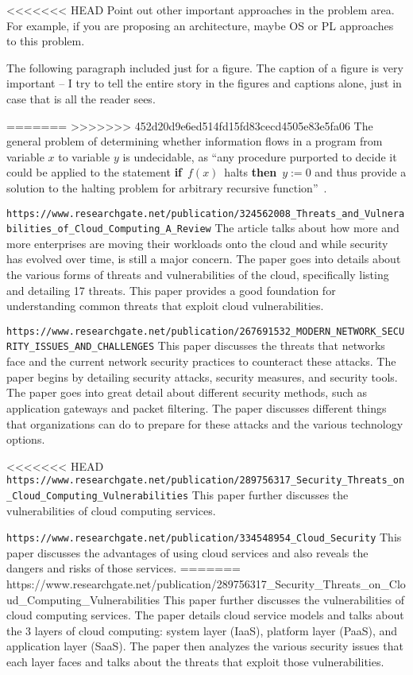 <<<<<<< HEAD
Point out other important approaches in the problem area. For example, if you 
are proposing an architecture, maybe OS or PL approaches to this problem. 

The following paragraph included just for a figure. The caption of a figure is very
important -- I try to tell the entire story in the figures and captions alone, 
just in case that is all the reader sees.

=======
>>>>>>> 452d20d9e6ed514fd15fd83cecd4505e83e5fa06
The general problem of determining whether information flows in a program from
variable $x$ to variable $y$ is undecidable, as ``any procedure purported to
decide it could be applied to the statement {\bf if}~$f(x)$~halts {\bf then}~$y
:= 0$ and thus provide a solution to the halting problem for arbitrary
recursive function''~\cite{denning-impossible}.  

\verb|https://www.researchgate.net/publication/324562008_Threats_and_Vulnerabilities_of_Cloud_Computing_A_Review|
The article talks about how more and more enterprises are moving their workloads onto the cloud and while
security has evolved over time, is still a major concern. The paper goes into details about the various forms
of threats and vulnerabilities of the cloud, specifically listing and detailing 17 threats. This paper
provides a good foundation for understanding common threats that exploit cloud vulnerabilities.

\verb|https://www.researchgate.net/publication/267691532_MODERN_NETWORK_SECURITY_ISSUES_AND_CHALLENGES|
This paper discusses the threats that networks face and the current network security practices to counteract these attacks.
The paper begins by detailing security attacks, security measures, and security tools. The paper goes into great detail about
different security methods, such as application gateways and packet filtering. The paper discusses different things that organizations
can do to prepare for these attacks and the various technology options.

<<<<<<< HEAD
\verb|https://www.researchgate.net/publication/289756317_Security_Threats_on_Cloud_Computing_Vulnerabilities|
This paper further discusses the vulnerabilities of cloud computing services.

\verb|https://www.researchgate.net/publication/334548954_Cloud_Security|
This paper discusses the advantages of using cloud services and also reveals the dangers and risks of those services.
=======
https://www.researchgate.net/publication/289756317_Security_Threats_on_Cloud_Computing_Vulnerabilities
This paper further discusses the vulnerabilities of cloud computing services. The paper details cloud service models and talks about
the 3 layers of cloud computing: system layer (IaaS), platform layer (PaaS), and application layer (SaaS). The paper then analyzes
the various security issues that each layer faces and talks about the threats that exploit those vulnerabilities.

